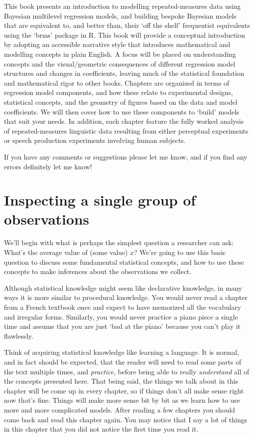 \documentclass[
]{book}
\begin{document}
This book presents an introduction to modelling repeated-measures data using Bayesian multilevel regression models, and building bespoke Bayesian models that are equivalent to, and better than, their `off the shelf' frequentist equivalents using the `brms' package in R. This book will provide a conceptual introduction by adopting an accessible narrative style that introduces mathematical and modelling concepts in plain English. A focus will be placed on understanding concepts and the visual/geometric consequences of different regression model structures and changes in coefficients, leaving much of the statistical foundation and mathematical rigor to other books. Chapters are organized in terms of regression model components, and how these relate to experimental designs, statistical concepts, and the geometry of figures based on the data and model coefficients. We will then cover how to use these components to `build' models that suit your needs. In addition, each chapter feature the fully worked analysis of repeated-measures linguistic data resulting from either perceptual experiments or speech production experiments involving human subjects.

If you have any comments or suggestions please let me know, and if you find any errors definitely let me know!

\hypertarget{inspecting-a-single-group-of-observations}{%
\chapter{Inspecting a single group of observations}\label{inspecting-a-single-group-of-observations}}

We'll begin with what is perhaps the simplest question a researcher can ask: What's the average value of (some value) \(x\)? We're going to use this basic question to discuss some fundamental statistical concepts, and how to use these concepts to make inferences about the observations we collect.

Although statistical knowledge might seem like declarative knowledge, in many ways it is more similar to procedural knowledge. You would never read a chapter from a French textbook once and expect to have memorized all the vocabulary and irregular forms. Similarly, you would never practice a piano piece a single time and assume that you are just `bad at the piano' because you can't play it flawlessly.

Think of acquiring statistical knowledge like learning a language. It is normal, and in fact should be expected, that the reader will need to read some parts of the text multiple times, and \emph{practice}, before being able to really \emph{understand} all of the concepts presented here. That being said, the things we talk about in this chapter will be come up in every chapter, so if things don't all make sense right now that's fine. Things will make more sense bit by bit as we learn how to use more and more complicated models. After reading a few chapters you should come back and read this chapter again. You may notice that I say a lot of things in this chapter that you did not notice the first time you read it.
\end{document}
